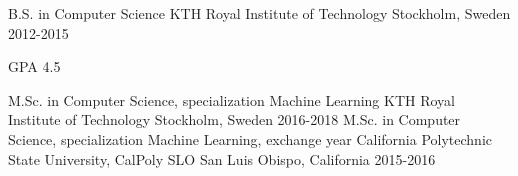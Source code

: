 

\begin{cventries}

  \cventry
    {B.S. in Computer Science} %
    {KTH Royal Institute of Technology} %
    {Stockholm, Sweden} %
    {2012-2015} %
    {
      \begin{cvitems} %
        \item {GPA 4.5}
      \end{cvitems}
    }
  \cventry
    {M.Sc. in Computer Science, specialization Machine Learning} %
    {KTH Royal Institute of Technology} %
    {Stockholm, Sweden} %
    {2016-2018} %
    {}
 \cventry    
    {M.Sc. in Computer Science, specialization Machine Learning, exchange year} %
    {California Polytechnic State University, CalPoly SLO} %
    {San Luis Obispo, California} %
    {2015-2016} %
    {
    }

\end{cventries}
